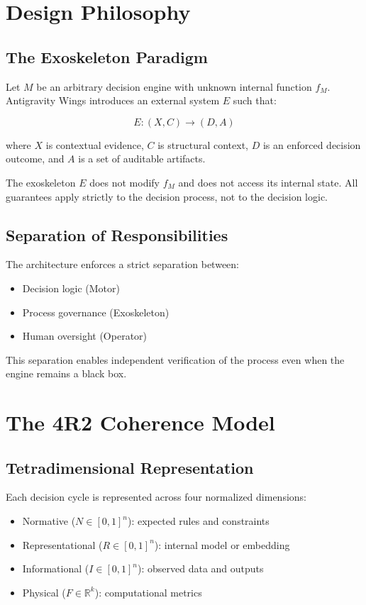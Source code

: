 \documentclass[11pt]{article}
\begin{document}
\section{Design Philosophy}

\subsection{The Exoskeleton Paradigm}

Let $M$ be an arbitrary decision engine with unknown internal function $f_M$. Antigravity Wings introduces an external system $E$ such that:

\[
E : (X, C) \rightarrow (D, A)
\]

where $X$ is contextual evidence, $C$ is structural context, $D$ is an enforced decision outcome, and $A$ is a set of auditable artifacts.

The exoskeleton $E$ does not modify $f_M$ and does not access its internal state. All guarantees apply strictly to the decision process, not to the decision logic.

\subsection{Separation of Responsibilities}

The architecture enforces a strict separation between:
\begin{itemize}
\item Decision logic (Motor)
\item Process governance (Exoskeleton)
\item Human oversight (Operator)
\end{itemize}

This separation enables independent verification of the process even when the engine remains a black box.

\section{The 4R2 Coherence Model}

\subsection{Tetradimensional Representation}

Each decision cycle is represented across four normalized dimensions:

\begin{itemize}
\item Normative ($N \in [0,1]^n$): expected rules and constraints
\item Representational ($R \in [0,1]^n$): internal model or embedding
\item Informational ($I \in [0,1]^n$): observed data and outputs
\item Physical ($F \in \mathbb{R}^k$): computational metrics
\end{itemize}
\end{document}
